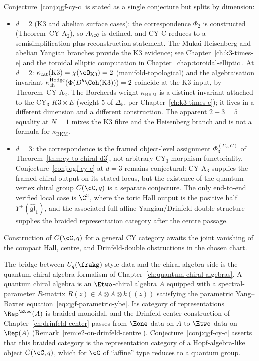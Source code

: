 \begin{remark}
\label{rem:qgf-cy-c-scope}
Conjecture~\ref{conj:qgf-cy-c} is stated as a single conjecture but splits by dimension:
\begin{itemize}
 \item $d = 2$ (K$3$ and abelian surface cases): the correspondence $\Phi_2$ is constructed (Theorem~CY-A$_2$), so $A_\cC$ is defined, and CY-C reduces to a semisimplification plus reconstruction statement. The Mukai Heisenberg and abelian Yangian branches provide the K3 evidence; see Chapter~\ref{ch:k3-times-e} and the toroidal elliptic computation in Chapter~\ref{chap:toroidal-elliptic}. At $d = 2$: $\kappa_{\mathrm{cat}}(\mathrm{K3}) = \chi(\cO_{\mathrm{K3}}) = 2$ (manifold-topological) and the algebraisation invariant $\kappa_{\mathrm{ch}}^{\mathrm{Hodge}}(\Phi(D^b\Coh(\mathrm{K3}))) = 2$ coincide at the K3 input, by Theorem~CY-A$_2$. The Borcherds weight $\kappa_{\mathrm{BKM}}$ is a distinct invariant attached to the CY$_3$ $K3\times E$ (weight $5$ of $\Delta_5$, per Chapter~\ref{ch:k3-times-e}); it lives in a different dimension and a different construction. The apparent $2+3=5$ equality at $N=1$ mixes the K3 fibre and the Heisenberg branch and is not a formula for $\kappa_{\mathrm{BKM}}$.
 \item $d = 3$: the correspondence is the framed object-level assignment $\Phi_3^{(\Sigma_2,C)}$ of Theorem~\ref{thm:cy-to-chiral-d3}, not arbitrary CY$_3$ morphism functoriality. Conjecture~\ref{conj:qgf-cy-c} at $d = 3$ remains conjectural: CY-A$_3$ supplies the framed chiral output on its stated locus, but the existence of the quantum vertex chiral group $C(\cC, q)$ is a separate conjecture. The only end-to-end verified local case is $\C^3$, where the toric Hall output is the positive half $Y^+(\widehat{\mathfrak{gl}}_1)$, and the associated full affine-Yangian/Drinfeld-double structure supplies the braided representation category after the centre passage.
\end{itemize}
Construction of $C(\cC, q)$ for a general CY category awaits the joint
vanishing of the compact Hall, centre, and Drinfeld-double
obstructions in the chosen chart.
\end{remark}

\begin{remark}
\label{rem:qgf-mediation}
The bridge between $U_q(\frakg)$-style data and the chiral algebra side is the quantum chiral algebra formalism of Chapter~\ref{ch:quantum-chiral-algebras}. A quantum chiral algebra is an $\Etwo$-chiral algebra $A$ equipped with a spectral-parameter $R$-matrix $R(z) \in A \otimes A \otimes k((z))$ satisfying the parametric Yang--Baxter equation~\eqref{eq:qgf-parametric-ybe}. Its category of representations $\Rep^{\Etwo}(A)$ is braided monoidal, and the Drinfeld center construction of Chapter~\ref{ch:drinfeld-center} passes from $\Eone$-data on $A$ to $\Etwo$-data on $\Rep(A)$ (Remark~\ref{rem:e2-on-drinfeld-centre}). Conjecture~\ref{conj:qgf-cy-c} asserts that this braided category is the representation category of a Hopf-algebra-like object $C(\cC, q)$, which for $\cC$ of ``affine'' type reduces to a quantum group.
\end{remark}

